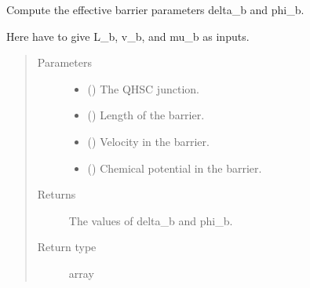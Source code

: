 \documentclass[letterpaper,10pt,english]{sphinxmanual}
\begin{document}
\begin{fulllineitems}
\label{\detokenize{modules:modules.utils.compute_delta_b_and_phi_b}}
\pysigstartsignatures
{}
\pysigstopsignatures
\sphinxAtStartPar
Compute the effective barrier parameters delta\_b and phi\_b.

\sphinxAtStartPar
Here have to give L\_b, v\_b, and mu\_b as inputs.
\begin{quote}\begin{description}
\item[{Parameters}] \leavevmode\begin{itemize}
\item {} 
\sphinxAtStartPar
{} () \textendash{} The QH\sphinxhyphen{}SC junction.

\item {} 
\sphinxAtStartPar
{} () \textendash{} Length of the barrier.

\item {} 
\sphinxAtStartPar
{} () \textendash{} Velocity in the barrier.

\item {} 
\sphinxAtStartPar
{} () \textendash{} Chemical potential in the barrier.

\end{itemize}

\item[{Returns}] \leavevmode
\sphinxAtStartPar
The values of delta\_b and phi\_b.

\item[{Return type}] \leavevmode
\sphinxAtStartPar
array

\end{description}\end{quote}

\end{fulllineitems}

\end{document}
